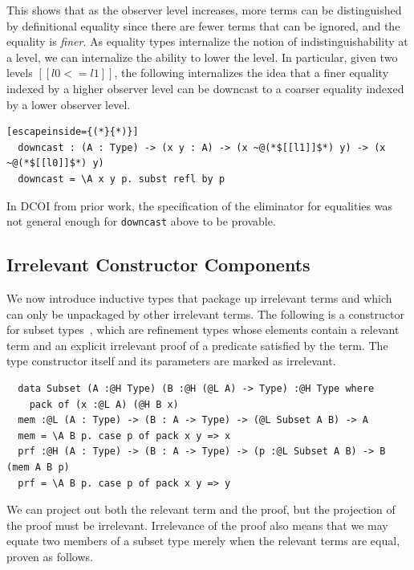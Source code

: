 \documentclass[acmsmall]{acmart}
\makeatletter
\theoremstyle{linked}
\theoremstyle{deflinked}
\theoremstyle{acmdefinition}
\newcommand{\dcoi}{DCOI\@\xspace}
\makeatother
\begin{document}
This shows that as the observer level increases,
more terms can be distinguished by definitional equality
since there are fewer terms that can be ignored,
and the equality is \emph{finer}.
As equality types internalize the notion of indistinguishability at a level,
we can internalize the ability to lower the level.
In particular, given two levels $[[l0 <= l1]]$, the
following internalizes the idea that a finer equality indexed by
a higher observer level can be downcast to a coarser equality indexed by
a lower observer level.

\begin{lstlisting}[escapeinside={(*}{*)}]
  downcast : (A : Type) -> (x y : A) -> (x ~@(*$[[l1]]$*) y) -> (x ~@(*$[[l0]]$*) y)
  downcast = \A x y p. subst refl by p
\end{lstlisting}

In \dcoi from prior work,
the specification of the eliminator for equalities was not general enough
for \lstinline{downcast} above to be provable.


\subsection{Irrelevant Constructor Components}

We now introduce inductive types
that package up irrelevant terms
and which can only be unpackaged by other irrelevant terms.
The following is a constructor for subset types~\citep{constable:nuprl},
which are refinement types whose elements
contain a relevant term and an explicit irrelevant proof
of a predicate satisfied by the term.
The type constructor itself and its parameters are marked as irrelevant.

\begin{lstlisting}
  data Subset (A :@H Type) (B :@H (@L A) -> Type) :@H Type where
    pack of (x :@L A) (@H B x)
  mem :@L (A : Type) -> (B : A -> Type) -> (@L Subset A B) -> A
  mem = \A B p. case p of pack x y => x
  prf :@H (A : Type) -> (B : A -> Type) -> (p :@L Subset A B) -> B (mem A B p)
  prf = \A B p. case p of pack x y => y
\end{lstlisting}

We can project out both the relevant term and the proof,
but the projection of the proof must be irrelevant.
Irrelevance of the proof also means that we may equate
two members of a subset type merely when the relevant terms are equal,
proven as follows.
\end{document}

